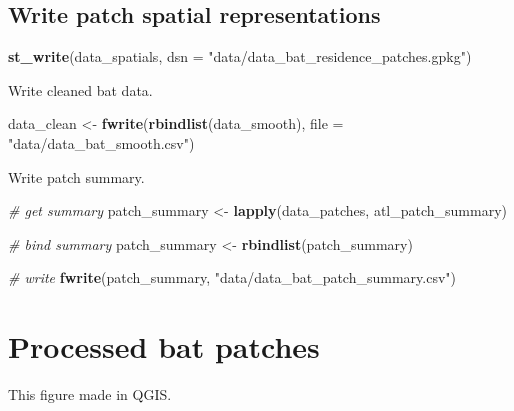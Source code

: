 \documentclass[
]{scrreprt}
\newenvironment{Shaded}{}{}
\newcommand{\CommentTok}[1]{\textcolor[rgb]{0.38,0.63,0.69}{\textit{#1}}}
\newcommand{\DataTypeTok}[1]{\textcolor[rgb]{0.56,0.13,0.00}{#1}}
\newcommand{\KeywordTok}[1]{\textcolor[rgb]{0.00,0.44,0.13}{\textbf{#1}}}
\newcommand{\NormalTok}[1]{#1}
\newcommand{\StringTok}[1]{\textcolor[rgb]{0.25,0.44,0.63}{#1}}
\begin{document}
\hypertarget{write-patch-spatial-representations}{%
\subsection{Write patch spatial representations}\label{write-patch-spatial-representations}}

\begin{Shaded}
\begin{Highlighting}[]
\KeywordTok{st\_write}\NormalTok{(data\_spatials,}
         \DataTypeTok{dsn =} \StringTok{"data/data\_bat\_residence\_patches.gpkg"}\NormalTok{)}
\end{Highlighting}
\end{Shaded}

Write cleaned bat data.

\begin{Shaded}
\begin{Highlighting}[]
\NormalTok{data\_clean <{-}}\StringTok{ }\KeywordTok{fwrite}\NormalTok{(}\KeywordTok{rbindlist}\NormalTok{(data\_smooth),}
                     \DataTypeTok{file =} \StringTok{"data/data\_bat\_smooth.csv"}\NormalTok{)}
\end{Highlighting}
\end{Shaded}

Write patch summary.

\begin{Shaded}
\begin{Highlighting}[]
\CommentTok{\# get summary}
\NormalTok{patch\_summary <{-}}\StringTok{ }\KeywordTok{lapply}\NormalTok{(data\_patches, atl\_patch\_summary)}

\CommentTok{\# bind summary}
\NormalTok{patch\_summary <{-}}\StringTok{ }\KeywordTok{rbindlist}\NormalTok{(patch\_summary)}

\CommentTok{\# write}
\KeywordTok{fwrite}\NormalTok{(patch\_summary,}
       \StringTok{"data/data\_bat\_patch\_summary.csv"}\NormalTok{)}
\end{Highlighting}
\end{Shaded}

\hypertarget{processed-bat-patches}{%
\section{Processed bat patches}\label{processed-bat-patches}}

This figure made in QGIS.
\end{document}
